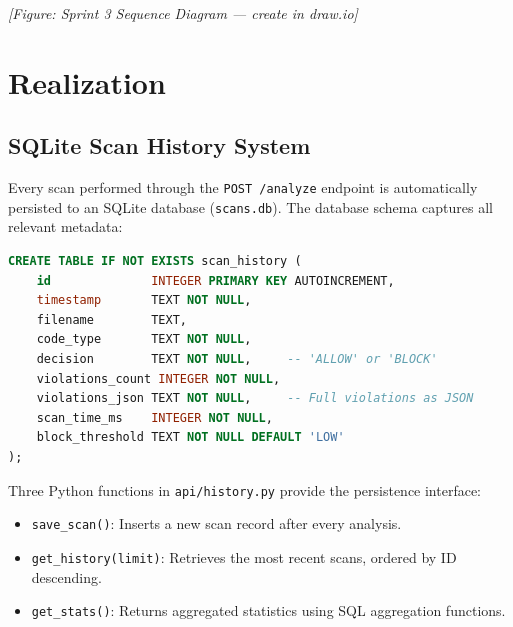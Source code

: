 
\textit{[Figure: Sprint 3 Sequence Diagram — create in draw.io]}

\section{Realization}

\subsection{SQLite Scan History System}

Every scan performed through the \texttt{POST /analyze} endpoint is automatically persisted to an SQLite database (\texttt{scans.db}). The database schema captures all relevant metadata:

\begin{lstlisting}[language=SQL, caption={SQLite schema for scan history}, label={lst:sqlite-schema}]
CREATE TABLE IF NOT EXISTS scan_history (
    id              INTEGER PRIMARY KEY AUTOINCREMENT,
    timestamp       TEXT NOT NULL,
    filename        TEXT,
    code_type       TEXT NOT NULL,
    decision        TEXT NOT NULL,     -- 'ALLOW' or 'BLOCK'
    violations_count INTEGER NOT NULL,
    violations_json TEXT NOT NULL,     -- Full violations as JSON
    scan_time_ms    INTEGER NOT NULL,
    block_threshold TEXT NOT NULL DEFAULT 'LOW'
);
\end{lstlisting}

Three Python functions in \texttt{api/history.py} provide the persistence interface:

\begin{itemize}
    \item \texttt{save\_scan()}: Inserts a new scan record after every analysis.
    \item \texttt{get\_history(limit)}: Retrieves the most recent scans, ordered by ID descending.
    \item \texttt{get\_stats()}: Returns aggregated statistics using SQL aggregation functions.
\end{itemize}

